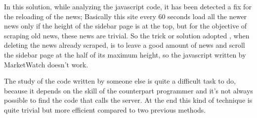 In this solution, while analyzing the javascript code, it has been detected a fix for the reloading of the news; Basically this site every 60 seconds load all the newer news only if the height of the sidebar page is at the top, but for the objective of scraping old news, these news are trivial. So the trick or solution adopted , when deleting the news already scraped, is to leave a good amount of news and scroll the sidebar page at the half of its maximum height, so the javascript written by MarketWatch doesn't work.
\par
The study of the code written by someone else is quite a difficult task to do, because it depends on the skill of the counterpart programmer and it's not always possible to find the code that calls the server. At the end this kind of technique is quite trivial but more efficient compared to two previous methods.
\par
